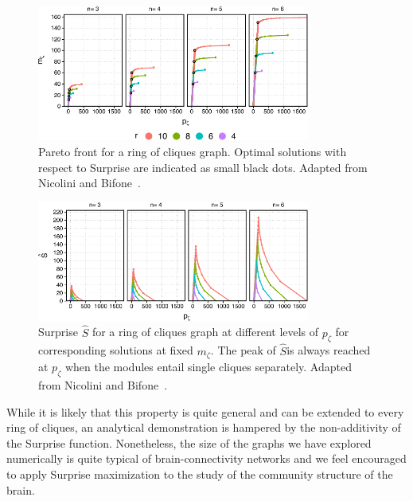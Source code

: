 \begin{figure}[htb!]
\centering
\includegraphics[width=0.8\textwidth]{images/ring_cliques_pareto.pdf}
\caption{Pareto front for a ring of cliques graph. Optimal solutions with respect to Surprise are indicated as small black dots. Adapted from Nicolini and Bifone~\cite{nicolini2016}.}
\label{fig:ring_cliques_pareto}
\end{figure}

\begin{figure}[htb!]
\centering
\includegraphics[width=0.8\textwidth]{images/ring_cliques_surprise.pdf}
\caption{Surprise $\hat{S}$ for a ring of cliques graph at different levels of $p_\zeta$ for corresponding solutions at fixed $m_\zeta$. The peak of $\hat{S} $is always reached at $p_\zeta$ when the modules entail single cliques separately. Adapted from Nicolini and Bifone~\cite{nicolini2016}.}
\label{fig:ring_cliques_surprise}
\end{figure}

While it is likely that this property is quite general and can be extended to every ring of cliques, an analytical demonstration is hampered by the non-additivity of the Surprise function.
Nonetheless, the size of the graphs we have explored numerically is quite typical of brain-connectivity networks and we feel encouraged to apply Surprise maximization to the study of the community structure of the brain.

